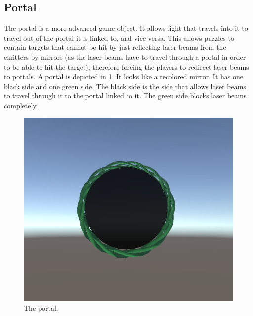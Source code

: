 		\subsection{Portal} \label{ssec:portal}
			The portal is a more advanced game object. It allows light that travels 
			into it to travel out of the portal it is linked to, and vice versa. This
			allows puzzles to contain targets that cannot be hit by just reflecting
			laser beams from the emitters by mirrors (as the laser beams have to
			travel through a portal in order to be able to hit the target),
			therefore forcing the players to redirect laser beams to portals.
			A portal is depicted in \ref{fig:portal}. It looks like a 
			recolored mirror. It has one black side and one green side. The 
			black side is the side that allows laser beams to travel through 
			it to the portal linked to it. The green side blocks laser beams completely.
			\begin{figure}[!ht]
				\centering
				\includegraphics[scale = 0.3]{Portal}
				\caption{The portal.}
				\label{fig:portal}
			\end{figure}
			
